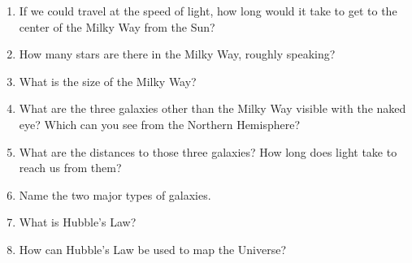 
\begin{enumerate}
\item If we could travel at the speed of light, how long would it take
  to get to the center of the Milky Way from the Sun?
\vspace{80pt}
\item How many stars are there in the Milky Way, roughly speaking?
\vspace{80pt}
\item What is the size of the Milky Way?
\vspace{80pt}
\item What are the three galaxies other than the Milky Way visible with
  the naked eye? Which can you see from the Northern Hemisphere?
\vspace{80pt}
\item What are the distances to those three galaxies? How long does
  light take to reach us from them?
\vspace{80pt}
\item Name the two major types of galaxies.
\vspace{80pt}
\item What is Hubble's Law?
\vspace{80pt}
\item How can Hubble's Law be used to map the Universe?
\vspace{80pt}
\end{enumerate}
